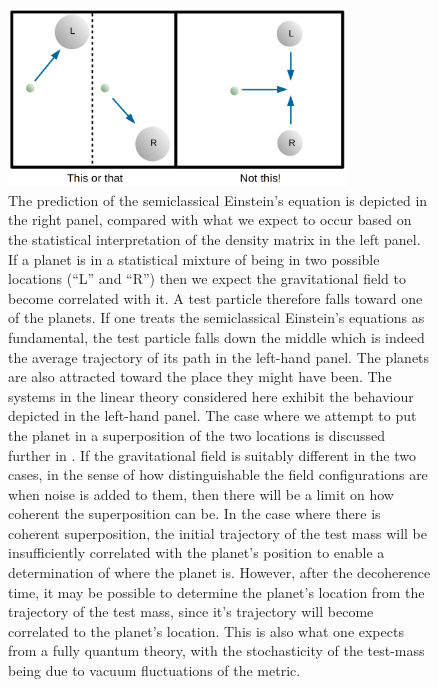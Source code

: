 \documentclass[aps,pra,showpacs,citeautoscript,amsmath,amssymb,floatfix,superscriptaddress,bbm, verbatim,amsfonts,changes,10pt,nofootinbib,longbibliography]{revtex4-1}
\begin{document}
\begin{figure}[h]
\includegraphics[width=0.8\textwidth]{notthis.png}
\caption{The prediction of the semiclassical Einstein's equation is depicted in the right panel, compared with what we expect to occur based on the statistical interpretation of the density matrix in the left panel. If a planet is in a statistical mixture of being in two possible locations (``L'' and ``R'') then we expect the gravitational field to become correlated with it. A test particle therefore falls toward one of the planets. If one treats the semiclassical Einstein's equations as fundamental, the test particle falls down the middle which is indeed the average trajectory of its path in the left-hand panel. The planets are also attracted toward the place they might have been. The systems in the linear theory considered here exhibit the behaviour depicted in the left-hand panel.
The case where we attempt to put the planet in a superposition of the two locations is discussed further in
\cite{layton2022semi,UCLcoherence}. If the gravitational field is suitably different in the two cases, in the sense of how distinguishable the field configurations  are when noise is added to them, then there will be a limit on how coherent the superposition can be\cite{UCLcoherence}. In the case where there is coherent superposition, the initial trajectory of the test mass will be insufficiently correlated with the planet's position to enable a determination of where the planet is. However, after the decoherence time, it may be possible to determine the planet's location from the trajectory of the test mass, since it's trajectory will become correlated to the planet's location\cite{layton2022semi}. This is also what one expects from a fully quantum theory, with the stochasticity of the test-mass being due to vacuum fluctuations of the metric. %
}
\label{fig:notthis}
\end{figure}
\end{document}
